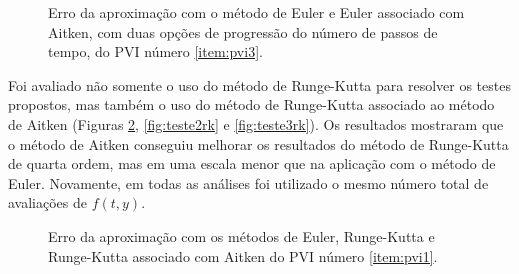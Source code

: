 \documentclass[final,5p]{elsarticle}
\numberwithin{equation}{section}
\begin{document}
        \begin{figure}[hbt!]
            \caption{Erro da aproximação com o método de Euler e Euler associado com Aitken, com duas opções de progressão do número de passos de tempo, do PVI número \ref{item:pvi3}.}
            \label{fig:teste3}
        \end{figure}

        Foi avaliado não somente o uso do método de Runge-Kutta para resolver os testes propostos, mas também o uso do método de Runge-Kutta associado ao método de Aitken (Figuras \ref{fig:teste1rk}, \ref{fig:teste2rk} e \ref{fig:teste3rk}). Os resultados mostraram que o método de Aitken conseguiu melhorar os resultados do método de Runge-Kutta de quarta ordem, mas em uma escala menor que na aplicação com o método de Euler. Novamente, em todas as análises foi utilizado o mesmo número total de avaliações de $f(t,y)$.

        \begin{figure}[hbt!]
            \caption{Erro da aproximação com os métodos de Euler, Runge-Kutta e Runge-Kutta associado com Aitken do PVI número \ref{item:pvi1}.}
            \label{fig:teste1rk}
        \end{figure}
\end{document}
